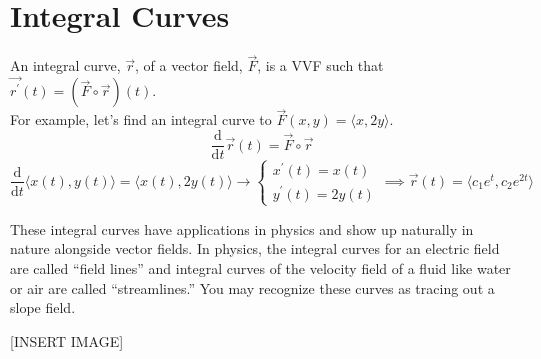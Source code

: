 \section{Integral Curves}
\noindent
An integral curve, $\vec{r}$, of a vector field, $\vec{F}$, is a VVF such that $\vec{r^\prime}(t) = \left(\vec{F}\circ\vec{r}\right)(t)$.\\

\noindent
For example, let's find an integral curve to $\vec{F}(x,y) = \langle x, 2y\rangle$.
\begin{equation*}
	\frac{\mathrm{d}}{\mathrm{d}t}\vec{r}(t) = \vec{F}\circ\vec{r}
\end{equation*}
\begin{equation*}
	\frac{\mathrm{d}}{\mathrm{d}t}\langle x(t), y(t) \rangle = \langle x(t), 2 y(t) \rangle \to
	\begin{cases}
		x^\prime(t) = x(t) \\
		y^\prime(t) = 2 y(t)
	\end{cases} 
	\implies \vec{r}(t) = \langle c_1 e^t, c_2 e^{2t} \rangle
\end{equation*}

\noindent
These integral curves have applications in physics and show up naturally in nature alongside vector fields. In physics, the integral curves for an electric field are called “field lines” and integral curves of the velocity field of a fluid like water or air are called “streamlines.” You may recognize these curves as tracing out a slope field.

[INSERT IMAGE]